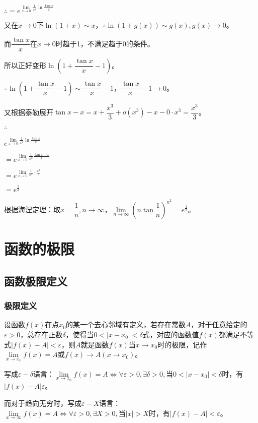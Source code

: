 \documentclass[UTF8, 12pt]{ctexart}
\begin{document}
$\therefore =e^{\lim\limits_{x\to 0}\frac{1}{x^2}\ln\frac{\tan x}{x}}$

又在$x\to 0$下$\ln (1+x)\sim x$，$\therefore \ln(1+g(x))\sim g(x),g(x)\to 0$。

而$\dfrac{\tan x}{x}$在$x\to 0$时趋于1，不满足趋于0的条件。

所以正好变形$\ln\left(1+\dfrac{\tan x}{x}-1\right)$。

$\therefore \ln\left(1+\dfrac{\tan x}{x}-1\right)\sim\dfrac{\tan x}{x}-1$，$\dfrac{\tan x}{x}-1\to 0$。

又根据泰勒展开$\tan x-x=x+\dfrac{x^3}{3}+o(x^3)-x-0\cdot x^3=\dfrac{x^3}{3}$。

$\therefore$ \medskip

$e^{\lim\limits_{x\to 0}\frac{1}{x^2}\ln\frac{\tan x}{x}}$

$=e^{\lim\limits_{x\to 0}\frac{1}{x^2}\frac{\tan x-x}{x}}$

$=e^{\lim\limits_{x\to 0}\frac{1}{x^2}\cdot\frac{x^2}{3}}$

$= e^{\frac{1}{3}}$

根据海涅定理：取$x=\dfrac{1}{n},n\to\infty$，$\lim\limits_{n\to\infty}\left(n\tan\dfrac{1}{n}\right)^{n^2}=e^{\frac{1}{3}}$。

\section{函数的极限}

\subsection{函数极限定义}

\subsubsection{极限定义}

设函数$f(x)$在点$x_0$的某一个去心邻域有定义，若存在常数$A$，对于任意给定的$\varepsilon>0$，总存在正数$\delta$，使得当$0<\vert x-x_0\vert<\delta$式，对应的函数值$f(x)$都满足不等式$\vert f(x)-A\vert <\varepsilon$，则$A$就是函数$f(x)$当$x\to x_0$时的极限，记作$\lim\limits_{x\to x_0}f(x)=A$或$f(x)\rightarrow A(x\rightarrow x_0)$。

写成$\varepsilon-\delta$语言：$\lim\limits_{x\to x_0}f(x)=A\Leftrightarrow\forall\varepsilon>0,\exists\delta>0,\text{当}0<\vert x-x_0\vert<\delta$时，有$\vert f(x)-A\vert\varepsilon$。

而对于趋向无穷时，写成$\varepsilon-X$语言：$\lim\limits_{x\to\infty}f(x)=A\Leftrightarrow\forall\varepsilon>0,\exists X>0,\text{当}\vert x\vert>X$时，有$\vert f(x)-A\vert<\varepsilon$。
\end{document}
